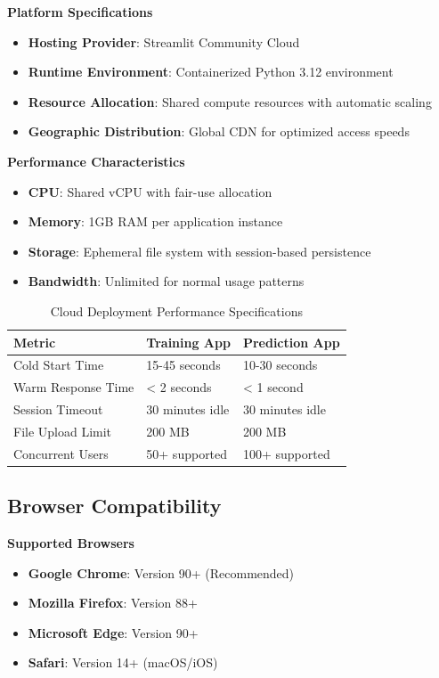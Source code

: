 \textbf{Platform Specifications}
\begin{itemize}
	\item \textbf{Hosting Provider}: Streamlit Community Cloud
	\item \textbf{Runtime Environment}: Containerized Python 3.12 environment
	\item \textbf{Resource Allocation}: Shared compute resources with automatic scaling
	\item \textbf{Geographic Distribution}: Global CDN for optimized access speeds
\end{itemize}

\textbf{Performance Characteristics}
\begin{itemize}
	\item \textbf{CPU}: Shared vCPU with fair-use allocation
	\item \textbf{Memory}: 1GB RAM per application instance
	\item \textbf{Storage}: Ephemeral file system with session-based persistence
	\item \textbf{Bandwidth}: Unlimited for normal usage patterns
\end{itemize}

\begin{table}[H]
	\centering
	\begin{tabularx}{\textwidth}{|X|X|X|}
		\hline
		\textbf{Metric} & \textbf{Training App} & \textbf{Prediction App} \\
		\hline
		Cold Start Time & 15-45 seconds & 10-30 seconds \\
		Warm Response Time & < 2 seconds & < 1 second \\
		Session Timeout & 30 minutes idle & 30 minutes idle \\
		File Upload Limit & 200 MB & 200 MB \\
		Concurrent Users & 50+ supported & 100+ supported \\
		\hline
	\end{tabularx}
	\caption{Cloud Deployment Performance Specifications}
	\label{tab:cloud_performance}
\end{table}

\subsection{Browser Compatibility}

\textbf{Supported Browsers}
\begin{itemize}
	\item \textbf{Google Chrome}: Version 90+ (Recommended)
	\item \textbf{Mozilla Firefox}: Version 88+
	\item \textbf{Microsoft Edge}: Version 90+
	\item \textbf{Safari}: Version 14+ (macOS/iOS)
\end{itemize}

